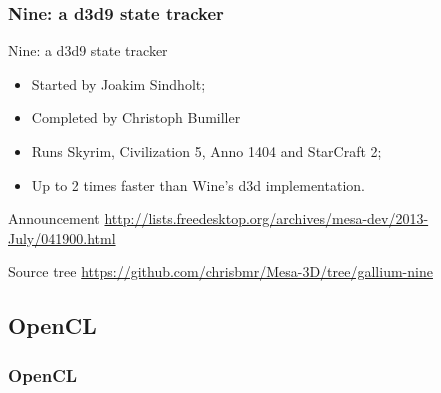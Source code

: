 \documentclass[11pt,english,compress]{beamer}
\begin{document}
\begin{frame}
	\frametitle{Nine: a d3d9 state tracker}

	\begin{block}{Nine: a d3d9 state tracker}
		\begin{itemize}
			\item Started by Joakim Sindholt;
			\item Completed by Christoph Bumiller
			\item Runs Skyrim, Civilization 5, Anno 1404 and StarCraft 2;
			\item Up to 2 times faster than Wine's d3d implementation.
		\end{itemize}
	\end{block}

	\begin{block}{Announcement}
		\url{http://lists.freedesktop.org/archives/mesa-dev/2013-July/041900.html}
	\end{block}

	\begin{block}{Source tree}
		\url{https://github.com/chrisbmr/Mesa-3D/tree/gallium-nine}
	\end{block}
\end{frame}

\subsection{OpenCL}
\begin{frame}
	\frametitle{OpenCL}

	\begin{block}{}
	\end{block}

\end{frame}
\end{document}
